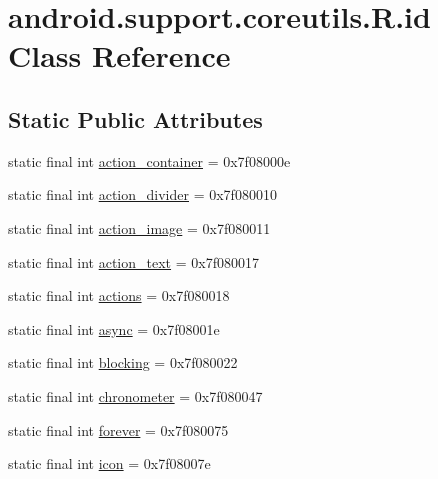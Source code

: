 \hypertarget{classandroid_1_1support_1_1coreutils_1_1_r_1_1id}{}\section{android.\+support.\+coreutils.\+R.\+id Class Reference}
\label{classandroid_1_1support_1_1coreutils_1_1_r_1_1id}
\subsection*{Static Public Attributes}
\begin{DoxyCompactItemize}
\item 
static final int \mbox{\hyperlink{classandroid_1_1support_1_1coreutils_1_1_r_1_1id_acef2a9e85463b5b560ea32ce9cd47e6b}{action\+\_\+container}} = 0x7f08000e
\item 
static final int \mbox{\hyperlink{classandroid_1_1support_1_1coreutils_1_1_r_1_1id_a9c73204912e07e7477a43af96d0e27c1}{action\+\_\+divider}} = 0x7f080010
\item 
static final int \mbox{\hyperlink{classandroid_1_1support_1_1coreutils_1_1_r_1_1id_a6188476618345e0309d8f3e197f8b8de}{action\+\_\+image}} = 0x7f080011
\item 
static final int \mbox{\hyperlink{classandroid_1_1support_1_1coreutils_1_1_r_1_1id_a2cc46f5d3c085d9a2ccd7ce052f355a6}{action\+\_\+text}} = 0x7f080017
\item 
static final int \mbox{\hyperlink{classandroid_1_1support_1_1coreutils_1_1_r_1_1id_aa63244327deb89946fd022a87e166481}{actions}} = 0x7f080018
\item 
static final int \mbox{\hyperlink{classandroid_1_1support_1_1coreutils_1_1_r_1_1id_a4927205f680e6c9b9bc3938c1b916cdc}{async}} = 0x7f08001e
\item 
static final int \mbox{\hyperlink{classandroid_1_1support_1_1coreutils_1_1_r_1_1id_a27c47c4fcebe9cfec13eb2467ad677f3}{blocking}} = 0x7f080022
\item 
static final int \mbox{\hyperlink{classandroid_1_1support_1_1coreutils_1_1_r_1_1id_a43bb36ecac9e8cb1a87d851023111e72}{chronometer}} = 0x7f080047
\item 
static final int \mbox{\hyperlink{classandroid_1_1support_1_1coreutils_1_1_r_1_1id_a83f5015de0c8a0799dc5b817254727e6}{forever}} = 0x7f080075
\item 
static final int \mbox{\hyperlink{classandroid_1_1support_1_1coreutils_1_1_r_1_1id_a9469a9fd3e114f6a1203fceb64114328}{icon}} = 0x7f08007e

\end{DoxyCompactItemize}
